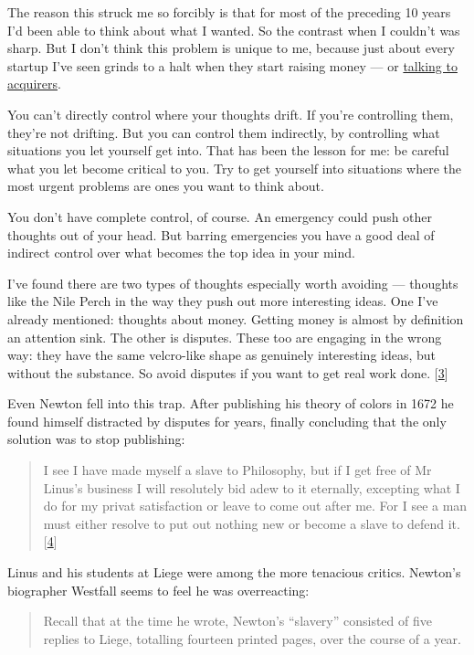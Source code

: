 The reason this struck me so forcibly is that for most of the preceding
10 years I'd been able to think about what I wanted. So the contrast
when I couldn't was sharp. But I don't think this problem is unique to
me, because just about every startup I've seen grinds to a halt when
they start raising money --- or \href{corpdev.html}{talking to
acquirers}.

You can't directly control where your thoughts drift. If you're
controlling them, they're not drifting. But you can control them
indirectly, by controlling what situations you let yourself get into.
That has been the lesson for me: be careful what you let become critical
to you. Try to get yourself into situations where the most urgent
problems are ones you want to think about.

You don't have complete control, of course. An emergency could push
other thoughts out of your head. But barring emergencies you have a good
deal of indirect control over what becomes the top idea in your mind.

I've found there are two types of thoughts especially worth avoiding ---
thoughts like the Nile Perch in the way they push out more interesting
ideas. One I've already mentioned: thoughts about money. Getting money
is almost by definition an attention sink. The other is disputes. These
too are engaging in the wrong way: they have the same velcro-like shape
as genuinely interesting ideas, but without the substance. So avoid
disputes if you want to get real work done. {[}\hyperref[f3n]{3}{]}

Even Newton fell into this trap. After publishing his theory of colors
in 1672 he found himself distracted by disputes for years, finally
concluding that the only solution was to stop publishing:

\begin{quote}
I see I have made myself a slave to Philosophy, but if I get free of Mr
Linus's business I will resolutely bid adew to it eternally, excepting
what I do for my privat satisfaction or leave to come out after me. For
I see a man must either resolve to put out nothing new or become a slave
to defend it. {[}\hyperref[f4n]{4}{]}
\end{quote}

Linus and his students at Liege were among the more tenacious critics.
Newton's biographer Westfall seems to feel he was overreacting:

\begin{quote}
Recall that at the time he wrote, Newton's ``slavery'' consisted of five
replies to Liege, totalling fourteen printed pages, over the course of a
year.
\end{quote}

